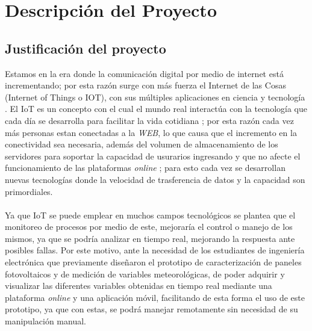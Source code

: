 
\chapter{Descripción del Proyecto}

\section{Justificación del proyecto}

Estamos en la era donde la comunicación digital por medio de internet está incrementando; por esta razón surge con más fuerza el Internet de las Cosas (Internet of  Things o IOT), con sus múltiples aplicaciones en ciencia y tecnología \cite{Noguera2016}. El  IoT es un concepto con el cual el mundo real interactúa con la tecnología que cada día se desarrolla para facilitar la vida cotidiana \cite{Atzori20102787};  por esta razón cada vez más personas estan conectadas a la \textit{WEB}, lo que causa que el incremento en la conectividad sea necesaria, además del volumen de almacenamiento de los servidores para soportar la capacidad de usurarios ingresando y que no afecte el funcionamiento de las plataformas \textit{online} \cite{10055838620160101}; para esto cada vez se desarrollan nuevas tecnologías donde la velocidad de trasferencia de datos y la capacidad son primordiales. 
\\
\\
Ya que IoT se puede emplear en muchos campos tecnológicos se plantea que el monitoreo de procesos por medio de este, mejoraría el control o manejo de los mismos, ya que se podría analizar en tiempo real, mejorando la respuesta ante posibles fallas. Por este motivo, ante la necesidad de los estudiantes de ingeniería electrónica que previamente diseñaron el prototipo de caracterización de paneles fotovoltaicos y de medición de variables meteorológicas\cite{Paneles}\cite{Proto}, de poder adquirir y visualizar las diferentes variables obtenidas en tiempo real mediante una plataforma \textit{online} y una aplicación móvil, facilitando de esta forma el uso de este prototipo, ya que con estas, se podrá manejar remotamente sin necesidad de su manipulación manual.

